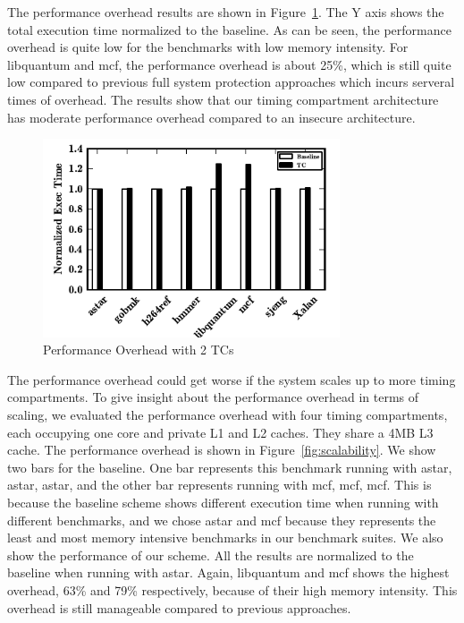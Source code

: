 The performance overhead results are shown in Figure~\ref{fig:performance}. The Y axis shows the total
execution time normalized to the baseline. As can be seen, the performance overhead is quite low
for the benchmarks with low memory intensity. For libquantum and mcf, the performance overhead is about 
25\%, which is still quite low compared to previous full system protection approaches which incurs serveral
times of overhead. The results show that our timing compartment architecture has moderate performance overhead
compared to an insecure architecture.

\begin{figure}
    \begin{center}
        \includegraphics[width=3.46in]{figs/performance.pdf}
        \caption{Performance Overhead with 2 TCs}
        \label{fig:performance}
    \end{center}
\end{figure}

The performance overhead could get worse if the system scales up to more timing compartments. To give insight
about the performance overhead in terms of scaling, we evaluated the performance overhead with four timing
compartments, each occupying one core and private L1 and L2 caches. They share a 4MB L3 cache. The performance
overhead is shown in Figure~\ref{fig:scalability}. We show two bars for the baseline. One bar represents this
benchmark running with {astar, astar, astar}, and the other bar represents running with {mcf, mcf, mcf}. This
is because the baseline scheme shows different execution time when running with different benchmarks, and we
chose astar and mcf because they represents the least and most memory intensive benchmarks in our benchmark
suites. We also show the performance of our scheme. All the results are normalized to the baseline when running
with astar. Again, libquantum and mcf shows the highest overhead, 63\% and 79\% respectively, because of their 
high memory intensity. This overhead is still manageable compared to previous approaches.

